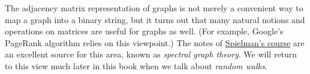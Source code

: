 The adjacency matrix representation of graphs is not merely a convenient
way to map a graph into a binary string, but it turns out that many
natural notions and operations on matrices are useful for graphs as
well. (For example, Google's PageRank algorithm relies on this
viewpoint.) The notes of
\href{http://www.cs.yale.edu/homes/spielman/561/}{Spielman's course} are
an excellent source for this area, known as \emph{spectral graph
theory}. We will return to this view much later in this book when we
talk about \emph{random walks}.
